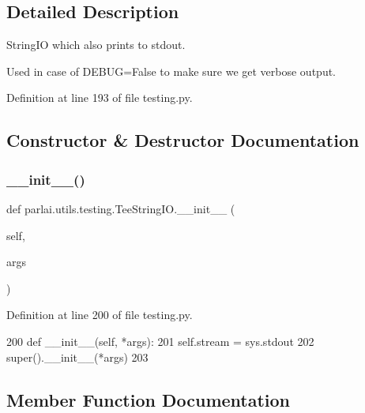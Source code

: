 \subsection{Detailed Description}
\begin{DoxyVerb}StringIO which also prints to stdout.

Used in case of DEBUG=False to make sure we get verbose output.
\end{DoxyVerb}
 

Definition at line 193 of file testing.\+py.



\subsection{Constructor \& Destructor Documentation}
\mbox{\label{classparlai_1_1utils_1_1testing_1_1TeeStringIO_a594bf609cf952ab21c412a4c520235d4}} 
\subsubsection{\texorpdfstring{\+\_\+\+\_\+init\+\_\+\+\_\+()}{\_\_init\_\_()}}
{\footnotesize\ttfamily def parlai.\+utils.\+testing.\+Tee\+String\+I\+O.\+\_\+\+\_\+init\+\_\+\+\_\+ (\begin{DoxyParamCaption}\item[{}]{self,  }\item[{}]{args }\end{DoxyParamCaption})}



Definition at line 200 of file testing.\+py.


\begin{DoxyCode}
200     \textcolor{keyword}{def }\_\_init\_\_(self, *args):
201         self.stream = sys.stdout
202         super().\_\_init\_\_(*args)
203 
\end{DoxyCode}


\subsection{Member Function Documentation}
\mbox{\label{classparlai_1_1utils_1_1testing_1_1TeeStringIO_a92670e92c021328191f396d1d4bb1759}} 
